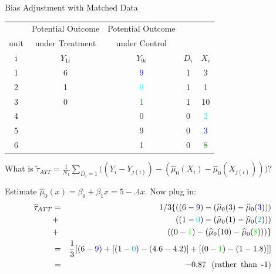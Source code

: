 \documentclass[xcolor=dvipsnames]{beamer}
\begin{document}
\begin{frame}{Bias Adjustment with Matched Data}
\footnotesize 
\begin{tabular}{c|c|c|c|c}
 &Potential Outcome & Potential Outcome &   & \\
unit &under Treatment  & under Control &   &  \\
\hline
   i  & $Y_{1i}$  & $Y_{0i}$ &    $D_i$ &  $X_i$ \\
\hline
         1 & \multicolumn{ 1}{c|}{6} & \multicolumn{ 1}{c|}{\textcolor{blue}{9}} &                    1 &          3 \\
         2 & \multicolumn{ 1}{c|}{1} & \multicolumn{ 1}{c|}{\textcolor{cyan}{0}} &                    1 &          1 \\
         3 & \multicolumn{ 1}{c|}{0} & \multicolumn{ 1}{c|}{\textcolor{green}{1}} &                    1 &          10 \\
\hline
         4 & \multicolumn{ 1}{c|}{} & \multicolumn{1}{c|}{0} &                    0 &          \textcolor{cyan}{2} \\
         5 & \multicolumn{ 1}{c|}{} & \multicolumn{1}{c|}{9} &                    0 &          \textcolor{blue}{3} \\
         6 & \multicolumn{ 1}{c|}{} & \multicolumn{1}{c|}{1} &                    0 &          \textcolor{green}{8} \\
         \hline
\end{tabular}

What is
$\tilde\tau_{ATT}= \frac{1}{N_1}\sum_{D_i=1} \Big((Y_i-Y_{j(i)})- (\widehat\mu_0(X_i)-\widehat\mu_0(X_{j(i)})) \Big)$?

Estimate $\widehat\mu_0(x)=\beta_0 + \beta_1 x = 5 - .4 x$. \pause Now
plug in:
\vspace{-.1in}
\begin{eqnarray*}
\widehat{\tau}_{ATT} &=&1/3 \{ ((6-\textcolor{blue}{9})-(\widehat\mu_0(3)-\widehat\mu_0(\textcolor{blue}{3})))\\
&+&((1-\textcolor{cyan}{0})-(\widehat\mu_0(1)-\widehat\mu_0(\textcolor{cyan}{2})))\\
&+&((0-\textcolor{green}{1})-
(\widehat\mu_0(10)-\widehat\mu_0(\textcolor{green}{8})))\}\\
&=& \frac{1}{3}[(6-\textcolor{blue}{9}) + 
[(1-\textcolor{cyan}{0})-(4.6-4.2)]+[(0-\textcolor{green}{1})-(1-1.8)]]\\
&=& -0.87  \text{\,\, (rather\, than\, -1)}
\end{eqnarray*}


\end{frame}
\end{document}
